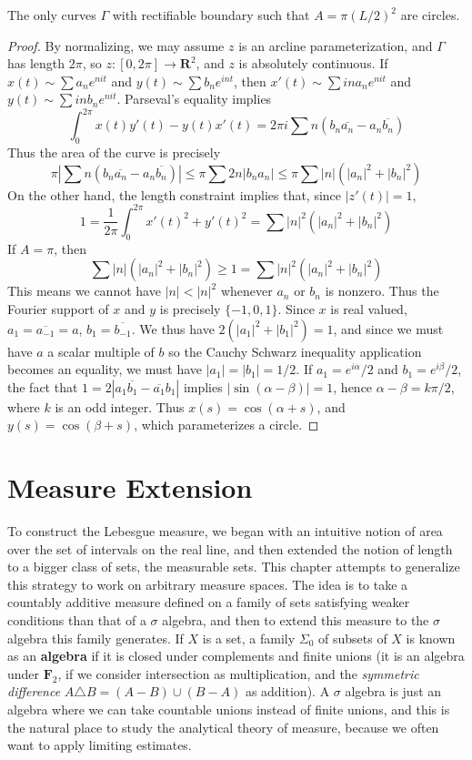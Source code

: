 \begin{theorem}
  The only curves $\Gamma$ with rectifiable boundary such that $A = \pi (L/2)^2$ are circles.
\end{theorem}
\begin{proof}
By normalizing, we may assume $z$ is an arcline parameterization, and $\Gamma$ has length $2\pi$, so $z:[0,2\pi] \to \mathbf{R}^2$, and $z$ is absolutely continuous. If $x(t) \sim \sum a_n e^{nit}$ and $y(t) \sim \sum b_n e^{int}$, then $x'(t) \sim \sum i n a_n e^{n i t}$ and $y(t) \sim \sum i n b_n e^{nit}$. Parseval's equality implies
%
\[ \int_0^{2\pi} x(t) y'(t) - y(t) x'(t) = 2 \pi i \sum n (b_n \overline{a_n} - a_n \overline{b_n}) \]
%
Thus the area of the curve is precisely
%
\[ \pi \left| \sum n (b_n \overline{a_n} - a_n \overline{b_n}) \right| \leq \pi \sum 2n|b_na_n| \leq \pi \sum |n|(|a_n|^2 + |b_n|^2) \]
%
On the other hand, the length constraint implies that, since $|z'(t)| = 1$,
%
\[ 1 = \frac{1}{2\pi} \int_0^{2\pi} x'(t)^2 + y'(t)^2 = \sum |n|^2(|a_n|^2 + |b_n|^2) \]
%
If $A = \pi$, then
%
\[ \sum |n| (|a_n|^2 + |b_n|^2) \geq 1 = \sum |n|^2 (|a_n|^2 + |b_n|^2) \]
%
This means we cannot have $|n| < |n|^2$ whenever $a_n$ or $b_n$ is nonzero. Thus the Fourier support of $x$ and $y$ is precisely $\{ -1, 0, 1 \}$. Since $x$ is real valued, $a_1 = \overline{a_{-1}} = a$, $b_1 = \overline{b_{-1}}$. We thus have $2(|a_1|^2 + |b_1|^2) = 1$, and since we must have $a$ a scalar multiple of $b$ so the Cauchy Schwarz inequality application becomes an equality, we must have $|a_1| = |b_1| = 1/2$. If $a_1 = e^{i\alpha}/2$ and $b_1 = e^{i\beta}/2$, the fact that $1 = 2|a_1\overline{b_1} - \overline{a_1}b_1|$ implies $|\sin(\alpha - \beta)| = 1$, hence $\alpha - \beta = k \pi /2$, where $k$ is an odd integer. Thus $x(s) = \cos(\alpha + s)$, and $y(s) = \cos(\beta + s)$, which parameterizes a circle.
\end{proof}

\chapter{Measure Extension}

To construct the Lebesgue measure, we began with an intuitive notion of area over the set of intervals on the real line, and then extended the notion of length to a bigger class of sets, the measurable sets. This chapter attempts to generalize this strategy to work on arbitrary measure spaces. The idea is to take a countably additive measure defined on a family of sets satisfying weaker conditions than that of a $\sigma$ algebra, and then to extend this measure to the $\sigma$ algebra this family generates. If $X$ is a set, a family $\Sigma_0$ of subsets of $X$ is known as an {\bf algebra} if it is closed under complements and finite unions (it is an algebra under $\mathbf{F}_2$, if we consider intersection as multiplication, and the {\it symmetric difference} $A \triangle B = (A - B) \cup (B - A)$ as addition). A $\sigma$ algebra is just an algebra where we can take countable unions instead of finite unions, and this is the natural place to study the analytical theory of measure, because we often want to apply limiting estimates.

